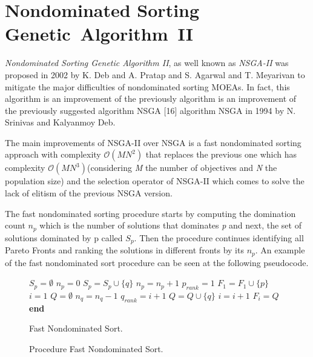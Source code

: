 \section{Nondominated Sorting Genetic~Algorithm~II}
\textit{Nondominated Sorting Genetic Algorithm II}, as well known as \textit{NSGA-II} was proposed in 2002 by K. Deb and A. Pratap and S. Agarwal and T. Meyarivan to mitigate the major difficulties of nondominated sorting MOEAs\cite{996017}. In fact, this algorithm is an improvement of the previously algorithm is an improvement of the previously suggested algorithm NSGA [16] algorithm NSGA\cite{Srinivas1994MuiltiobjectiveOU} in 1994 by N. Srinivas and Kalyanmoy Deb.

The main improvements of NSGA-II over NSGA is a fast nondominated sorting approach with complexity $\mathcal{O}(MN^{2})$ that replaces the previous one which has complexity $\mathcal{O}(MN^{3})$\cite{996017}(considering \textit{M} the number of objectives and \textit{N} the population size) and the selection operator of NSGA-II which comes to solve the lack of elitism of the previous NSGA version. 

The fast nondominated sorting procedure starts by computing the domination count $n_{p}$ which is the number of solutions that dominates \textit{p} and next, the set of solutions dominated by p called \textit{$S_{p}$}. Then the procedure continues identifying all Pareto Fronts and ranking the solutions in different fronts by its $n_{p}$\cite{996017}. An example of the fast nondominated sort procedure can be seen at the following pseudocode.

\begin{figure}
    \centering
\begin{algorithm}[H]
\begin{algorithmic}[1]
    \State $S_{p} = \emptyset$
    \State $n_{p} = 0$
            \State $S_{p} = S_{p} \cup \{q\}$
        \Else {}
                \State $n_{p} = n_{p} + 1$
            \EndIf
        \EndIf
    \EndFor
        \State $p_{rank} = 1$
        \State $F_{1} = F_{1} \cup \{p\}$
    \EndIf
\EndFor
\State $i = 1$
    \State $Q = \emptyset$
            \State $n_{q} = n_{q} - 1$
                \State $q_{rank} = i + 1$
                \State $Q = Q \cup \{q\}$
            \EndIf
        \EndFor
    \EndFor
    \State $i = i + 1$
    \State $F_{i} = Q$
\EndWhile
\State \textbf{end}
\end{algorithmic}
\caption{Fast Nondominated Sort.}
\end{algorithm}
\caption{Procedure Fast Nondominated Sort.}
\end{figure}

